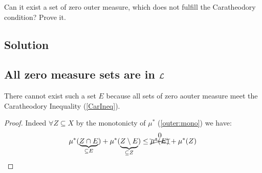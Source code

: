 

\question
Can it exist a set of zero outer measure, which does not fulfill the Caratheodory condition? Prove it.

\subsection*{Solution}

\subsection{All zero measure sets are in \texorpdfstring{$\mathcal{L}$}{L}} \label{zerosetsaremeas}
There cannot exist such a set $E$ because all sets of zero aouter measure meet the Caratheodory Inequality (\ref{CarIneq}).

\begin{proof}\label{outer:zeromeas}
    Indeed $\forall Z \subseteq X$ by the monotonicty of $\mu^*$ (\ref{outer:mono}) we have:
    \[
        \mu^*(\underbrace{Z\cap E}_{\subseteq E}) + \mu^*(\underbrace{Z\setminus E}_{\subseteq Z}) \leq \overset{\text{\normalsize0}}{\xcancel{\mu^*(E)}} + \mu^*(Z)
    \]
\end{proof}
